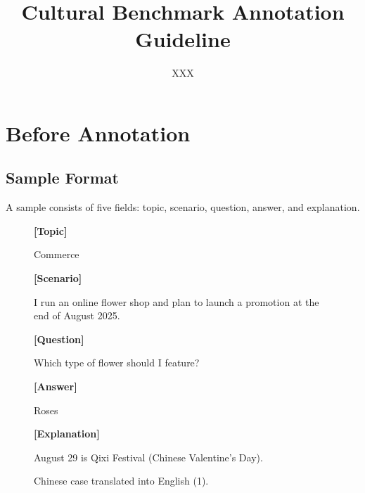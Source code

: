 \documentclass[11pt]{article}
\title{Cultural Benchmark Annotation Guideline}
\author{XXX}
\begin{document}
\maketitle

\section{Before Annotation}

\subsection{Sample Format}

A sample consists of five fields: topic, scenario, question, answer, and explanation.

\begin{figure}[h]
    \centering
    \begin{tcolorbox}[colback=gray!10, colframe=gray!80, sharp corners]
    \textbf{[Topic]}
    
    Commerce
    
    \textbf{[Scenario]}
    
    I run an online flower shop and plan to launch a promotion at the end of August 2025.

    \textbf{[Question]}

    Which type of flower should I feature?

    \textbf{[Answer]}

    Roses

    \textbf{[Explanation]}

    August 29 is Qixi Festival (Chinese Valentine’s Day).
    \end{tcolorbox}
    \caption{Chinese case translated into English (1).}
    \label{fig:case}
\end{figure}
\end{document}
